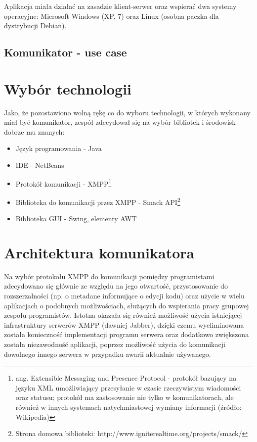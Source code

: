 \documentclass[polish,11pt,a4paper,twoside]{article}
\begin{document}

Aplikacja miała działać na zasadzie klient-serwer oraz wspierać dwa systemy operacyjne: Microsoft Windows (XP, 7) oraz Linux (osobna paczka dla dystrybucji Debian).

\subsection{Komunikator - use case}

\section{Wybór technologii}

Jako, że pozostawiono wolną rękę co do wyboru technologii, w których wykonany miał być komunikator, zespół zdecydował się na wybór bibliotek i środowisk dobrze mu znanych:
\begin{itemize}
\item Język programowania - Java
\item IDE - NetBeans
\item Protokół komunikacji - XMPP\footnote{ang. Extensible Messaging and Presence Protocol - protokół bazujący na języku XML umożliwiający przesyłanie w czasie rzeczywistym wiadomości oraz statusu; protokół ma zastosowanie nie tylko w komunikatorach, ale również w innych systemach natychmiastowej wymiany informacji (źródło: Wikipedia)}
\item Biblioteka do komunikacji przez XMPP - Smack API\footnote{Strona domowa biblioteki: http://www.igniterealtime.org/projects/smack/}
\item Biblioteka GUI - Swing, elementy AWT
\end{itemize}

\section{Architektura komunikatora}

Na wybór protokołu XMPP do komunikacji pomiędzy programistami zdecydowano się głównie ze względu na jego otwartość, przystosowanie do rozszerzalności (np. o metadane informujące o edycji kodu) oraz użycie w wielu aplikacjach o podobnych możliwościach, służących do wspierania pracy grupowej zespołu programistów. Istotna okazała się również możliwość użycia istniejącej infrastruktury serwerów XMPP (dawniej Jabber), dzięki czemu wyeliminowana została konieczność implementacji programu serwera oraz dodatkowo zwiększona została niezawodność aplikacji, poprzez możliwość użycia do komunikacji dowolnego innego serwera w przypadku awarii aktualnie używanego.
\end{document}
